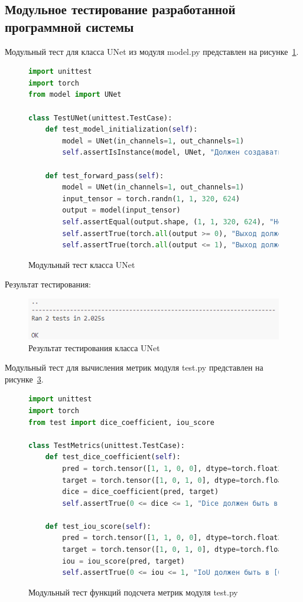 \subsection{Модульное тестирование разработанной программной системы}

Модульный тест для класса UNet из модуля model.py представлен на рисунке~\ref{model_test:image}.

\begin{figure}[H]
\begin{lstlisting}[language=Python]
import unittest
import torch
from model import UNet

class TestUNet(unittest.TestCase):
	def test_model_initialization(self):
		model = UNet(in_channels=1, out_channels=1)
		self.assertIsInstance(model, UNet, "Должен создаваться экземпляр UNet")
	
	def test_forward_pass(self):
		model = UNet(in_channels=1, out_channels=1)
		input_tensor = torch.randn(1, 1, 320, 624)
		output = model(input_tensor)
		self.assertEqual(output.shape, (1, 1, 320, 624), "Некорректный размер вывода")
		self.assertTrue(torch.all(output >= 0), "Выход должен быть ≥ 0")
		self.assertTrue(torch.all(output <= 1), "Выход должен быть ≤ 1")
\end{lstlisting}  
\caption{Модульный тест класса UNet}
\label{model_test:image}
\end{figure}

Результат тестирования:
\begin{figure}[H]
	\centering
	\includegraphics[width=0.7\linewidth]{images/model_test_results}
	\caption{Результат тестирования класса UNet}
	\label{fig:modeltestresults}
\end{figure}

Модульный тест для вычисления метрик модуля test.py представлен на рисунке~\ref{test_test:image}.

\begin{figure}[H]
	\begin{lstlisting}[language=Python]
import unittest
import torch
from test import dice_coefficient, iou_score

class TestMetrics(unittest.TestCase):
	def test_dice_coefficient(self):
		pred = torch.tensor([1, 1, 0, 0], dtype=torch.float32)
		target = torch.tensor([1, 0, 1, 0], dtype=torch.float32)
		dice = dice_coefficient(pred, target)
		self.assertTrue(0 <= dice <= 1, "Dice должен быть в [0, 1]")

	def test_iou_score(self):
		pred = torch.tensor([1, 1, 0, 0], dtype=torch.float32)
		target = torch.tensor([1, 0, 1, 0], dtype=torch.float32)
		iou = iou_score(pred, target)
		self.assertTrue(0 <= iou <= 1, "IoU должен быть в [0, 1]")
	\end{lstlisting}  
	\caption{Модульный тест функций подсчета метрик модуля test.py}
	\label{test_test:image}
\end{figure}

